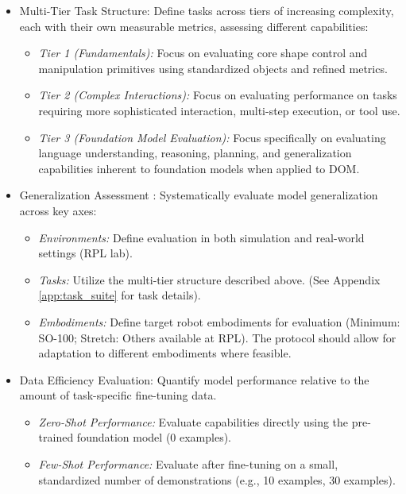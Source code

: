 \begin{itemize}
    \item Multi-Tier Task Structure: Define tasks across tiers of increasing complexity, each with their own measurable metrics, assessing different capabilities:
        \begin{itemize}
            \item \textit{Tier 1 (Fundamentals):} Focus on evaluating core shape control and manipulation primitives using standardized objects and refined metrics.
            \item \textit{Tier 2 (Complex Interactions):} Focus on evaluating performance on tasks requiring more sophisticated interaction, multi-step execution, or tool use.
            \item \textit{Tier 3 (Foundation Model Evaluation):} Focus specifically on evaluating language understanding, reasoning, planning, and generalization capabilities inherent to foundation models when applied to DOM.
        \end{itemize}
    \item Generalization Assessment \cite{TransferWelle}: Systematically evaluate model generalization across key axes:
        \begin{itemize}
            \item \textit{Environments:} Define evaluation in both simulation and real-world settings (RPL lab).
            \item \textit{Tasks:} Utilize the multi-tier structure described above. (See Appendix \ref{app:task_suite} for task details).
            \item \textit{Embodiments:} Define target robot embodiments for evaluation (Minimum: SO-100; Stretch: Others available at RPL). The protocol should allow for adaptation to different embodiments where feasible.
        \end{itemize}
    \item Data Efficiency Evaluation: Quantify model performance relative to the amount of task-specific fine-tuning data.
        \begin{itemize}
            \item \textit{Zero-Shot Performance:} Evaluate capabilities directly using the pre-trained foundation model (0 examples).
            \item \textit{Few-Shot Performance:} Evaluate after fine-tuning on a small, standardized number of demonstrations (e.g., 10 examples, 30 examples).
        \end{itemize}
\end{itemize}

